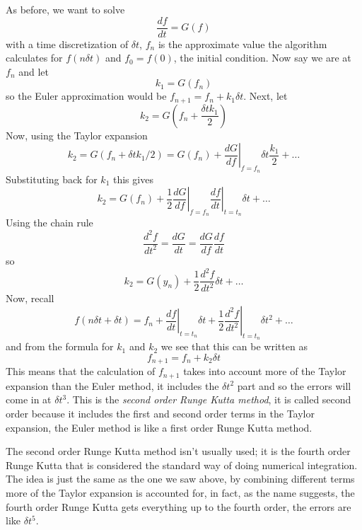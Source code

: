 \documentclass[12pt]{article}
\begin{document}
As before, we want to solve
\begin{equation}
\frac{df}{dt}=G(f)
\end{equation}
with a time discretization of $\delta t$, $f_n$ is the approximate
value the algorithm calculates for $f(n\delta t)$ and $f_0=f(0)$, the
initial condition. Now say we are at $f_n$ and let
\begin{equation}
k_1=G(f_n)
\end{equation}
so the Euler approximation would be $f_{n+1}=f_n+k_1\delta t$. Next, let
\begin{equation}
k_2=G\left(f_n+\frac{\delta t k_1}{2}\right)
\end{equation}
Now, using the Taylor expansion
\begin{equation}
k_2=G(f_n+\delta t k_1/2)=G(f_n)+\left.\frac{dG}{df}\right|_{f=f_n}\delta t\frac{k_1}{2}+\ldots
\end{equation}
Substituting back for $k_1$ this gives
\begin{equation}
k_2=G(f_n)+\frac{1}{2}\left.\frac{dG}{df}\right|_{f=f_n}\left.\frac{df}{dt}\right|_{t=t_n}\delta t+\ldots
\end{equation}
Using the chain rule
\begin{equation}
\frac{d^2f}{dt^2}=\frac{dG}{dt}=\frac{dG}{df}\frac{df}{dt}
\end{equation}
so
\begin{equation}
k_2=G(y_n)+\frac{1}{2}\frac{d^2f}{dt^2}\delta t+\ldots
\end{equation}
Now, recall
\begin{equation}
f(n\delta t + \delta t)=f_n+\left.\frac{df}{dt}\right|_{t=t_n}\delta t+\frac{1}{2}\left.\frac{d^2f}{dt^2}\right|_{t=t_n}\delta t^2+\ldots
\end{equation}
and from the formula for $k_1$ and $k_2$ we see that this can be written as
\begin{equation}
f_{n+1}=f_n+k_2\delta t
\end{equation}
This means that the calculation of $f_{n+1}$ takes into account
more of the Taylor expansion than the Euler method, it includes the
$\delta t^2$ part and so the errors will come in at $\delta t^3$.
This is the \textsl{second order Runge Kutta method}, it is called
second order because it includes the first and second order terms in
the Taylor expansion, the Euler method is like a first order Runge
Kutta method.

The second order Runge Kutta method isn't usually used; it is the
fourth order Runge Kutta that is considered the standard way of doing
numerical integration. The idea is just the same as the one we saw
above, by combining different terms more of the Taylor expansion is
accounted for, in fact, as the name suggests, the fourth order Runge
Kutta gets everything up to the fourth order, the errors are like
$\delta t^5$.
\end{document}

